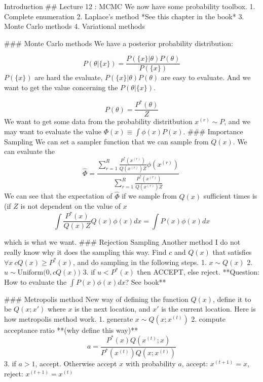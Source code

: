 \documentclass{beamer}
\begin{document}
\begin{frame}[allowframebreaks]{Introduction}
    ## Lecture 12 : MCMC
    We now have some probability toolbox. 
    1. Complete enumeration
    2. Laplace's method *See this chapter in the book*
    3. Monte Carlo methods
    4. Variational methods
    
    ### Monte Carlo methods
    We have a posterior probability distribution:
    
    \begin{equation*}
    P( \theta |\{x\}) =\frac{P(\{x\} |\theta ) P( \theta )}{P(\{x\})}
    \end{equation*}
    $P(\{x\})$ are hard the evaluate, $P(\{x\} |\theta ) P( \theta )$ are easy to evaluate. And we want to get the value concerning the $P( \theta |\{x\})$. 
    
    \begin{equation*}
    P( \theta ) =\frac{P^{*}( \theta )}{Z}
    \end{equation*}
    We want to get some data from the probability distritbution $x^{( r)} \sim P$, and we may want to evaluate the value $\Phi ( x) \equiv \int \phi ( x) P( x)$.
    ### Importance Sampling
    We can set a sampler function that we can sample from $Q( x)$. We can evaluate the 
    \begin{equation*}
    \hat{\Phi } =\frac{\sum ^{R}_{r=1}\frac{P^{*}\left( x^{( r)}\right)}{Q\left( x^{( r)}\right) Z} \phi \left( x^{( r)}\right)}{\sum ^{R}_{r=1}\frac{P^{*}\left( x^{( r)}\right)}{Q\left( x^{( r)}\right) Z}} \ 
    \end{equation*}
    We can see that the expectation of $\hat{\Phi }$ if we sample from $Q( x)$ sufficient times is (if $Z$ is not dependent on the value of $x$
    \begin{equation*}
    \int \frac{P^{*}( x)}{Q( x) Z} Q( x) \phi ( x) dx=\int P( x) \phi ( x) dx
    \end{equation*}
    
    which is what we want.
    ### Rejection Sampling
    Another method I do not really know why it does the sampling this way.
    Find $c$ and $Q( x)$ that satisfies $\forall x\ cQ( x) \geqslant P^{*}( x)$, and do sampling in the following steps. 
    1. $x\sim Q( x)$
    2. $u\sim \text{Uniform(} 0,cQ( x)\text{)}$
    3. if $u< P^{*}( x)$ then ACCEPT, else reject. 
    **Question: How to evaluate the $\int P( x) \phi ( x) dx$? See book**
    
    ### Metropolis method
    New way of defining the function $Q( x)$, define it to be $Q( x;x')$ where $x$ is the next location, and $x'$ is the current location. 
    Here is how metropolis method work. 
    1. generate $x\sim Q\left( x;x^{( t)}\right)$
    2. compute acceptance ratio **(why define this way)**
    \begin{equation*}
    a=\frac{P^{*}( x) Q\left( x^{( t)} ;x\right)}{P^{*}\left( x^{( t)}\right) Q\left( x;x^{( t)}\right)}
    \end{equation*}
    3. if $a >1$, accept. Otherwise accept $x$ with probability $a$, accept: $x^{( t+1)} =x$, reject: $x^{( t+1)} =x^{( t)}$
    

\end{frame}
\end{document}
